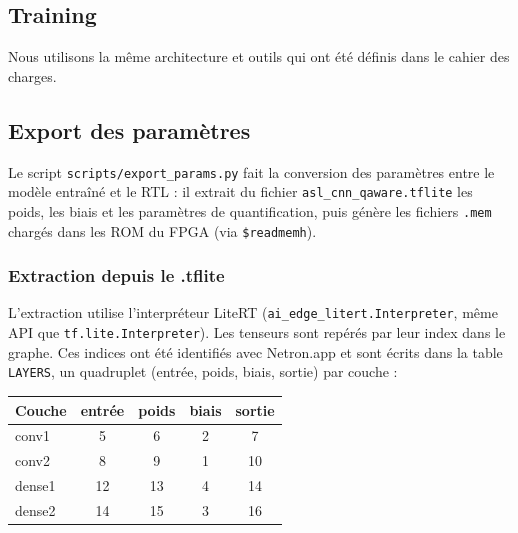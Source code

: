 \documentclass[11pt,a4paper]{article}
\begin{document}
\subsection{Training}

Nous utilisons la même architecture et outils qui ont été définis dans le
cahier des charges.

\subsection{Export des paramètres}

Le script \texttt{scripts/export\_params.py} fait la conversion des
paramètres entre le modèle entraîné et le RTL : il extrait du fichier
\texttt{asl\_cnn\_qaware.tflite} les poids, les biais et les paramètres de
quantification, puis génère les fichiers \texttt{.mem} chargés dans les ROM
du FPGA (via \texttt{\$readmemh}).

\subsubsection{Extraction depuis le .tflite}

L'extraction utilise l'interpréteur LiteRT
(\texttt{ai\_edge\_litert.Interpreter}, même API que
\texttt{tf.lite.Interpreter}). Les tenseurs sont repérés par leur index dans
le graphe. Ces indices ont été identifiés avec Netron.app et sont écrits dans
la table \texttt{LAYERS}, un quadruplet (entrée, poids, biais, sortie) par
couche :

\begin{center}
\begin{tabular}{lcccc}
  \toprule
  Couche & entrée & poids & biais & sortie \\
  \midrule
  conv1  & 5  & 6  & 2 & 7  \\
  conv2  & 8  & 9  & 1 & 10 \\
  dense1 & 12 & 13 & 4 & 14 \\
  dense2 & 14 & 15 & 3 & 16 \\
  \bottomrule
\end{tabular}
\end{center}
\end{document}
